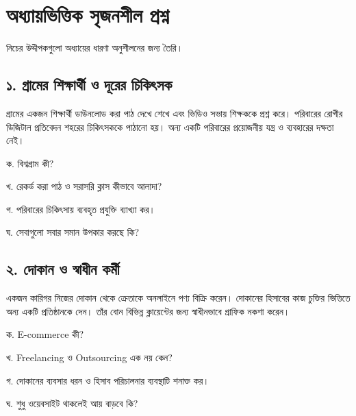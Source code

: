 \section{অধ্যায়ভিত্তিক সৃজনশীল প্রশ্ন}
নিচের উদ্দীপকগুলো অধ্যায়ের ধারণা অনুশীলনের জন্য তৈরি।
\subsection{১. গ্রামের শিক্ষার্থী ও দূরের চিকিৎসক}
গ্রামের একজন শিক্ষার্থী ডাউনলোড করা পাঠ দেখে শেখে এবং ভিডিও সভায় শিক্ষককে প্রশ্ন করে। পরিবারের রোগীর ডিজিটাল প্রতিবেদন শহরের চিকিৎসককে পাঠানো হয়। অন্য একটি পরিবারের প্রয়োজনীয় যন্ত্র ও ব্যবহারের দক্ষতা নেই।
\begin{compactenum}
\item ক. বিশ্বগ্রাম কী?

\item খ. রেকর্ড করা পাঠ ও সরাসরি ক্লাস কীভাবে আলাদা?

\item গ. পরিবারের চিকিৎসায় ব্যবহৃত প্রযুক্তি ব্যাখ্যা কর।

\item ঘ. সেবাগুলো সবার সমান উপকার করছে কি?

\end{compactenum}

\subsection{২. দোকান ও স্বাধীন কর্মী}
একজন কারিগর নিজের দোকান থেকে ক্রেতাকে অনলাইনে পণ্য বিক্রি করেন। দোকানের হিসাবের কাজ চুক্তির ভিত্তিতে অন্য একটি প্রতিষ্ঠানকে দেন। তাঁর বোন বিভিন্ন ক্লায়েন্টের জন্য স্বাধীনভাবে গ্রাফিক নকশা করেন।
\begin{compactenum}
\item ক. E-commerce কী?

\item খ. Freelancing ও Outsourcing এক নয় কেন?

\item গ. দোকানের ব্যবসার ধরন ও হিসাব পরিচালনার ব্যবস্থাটি শনাক্ত কর।

\item ঘ. শুধু ওয়েবসাইট থাকলেই আয় বাড়বে কি?

\end{compactenum}

